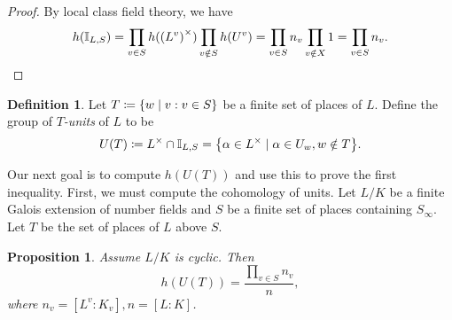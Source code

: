 \documentclass[leqno, openany]{memoir}
\newtheorem{prop}[thm]{Proposition}
\theoremstyle{definition}
\newtheorem{defn}[thm]{Definition}
\theoremstyle{remark}
\theoremstyle{plain}
\theoremstyle{definition}
\theoremstyle{remark}
\newcommand{\I}{\mathbb{I}}
\begin{document}
\begin{proof}
    By local class field theory, we have
    \[ h(\I_{L, S}) = \prod_{v \in S} h({(L^v)}^{\times}) \prod_{v \notin S} h(U^v) = \prod_{v \in S} n_v \prod_{v \notin X} 1 = \prod_{v \in S} n_v. \qedhere \]
\end{proof}

\begin{defn}
    Let $T \coloneqq \qty{w \mid v : v \in S}$ be a finite set of places of $L$. Define the group of \textit{$T$-units} of $L$ to be
    \[ U(T) \coloneqq L^{\times} \cap \I_{L, S} = \qty{\alpha \in L^{\times} \mid \alpha \in U_w, w \notin T}. \]
\end{defn}

Our next goal is to compute $h(U(T))$ and use this to prove the first inequality. First, we must compute the cohomology of units. Let $L/K$ be a finite Galois extension of number fields and $S$ be a finite set of places containing $S_{\infty}$. Let $T$ be the set of places of $L$ above $S$.

\begin{prop}
    Assume $L/K$ is cyclic. Then 
    \[ h(U(T)) = \frac{\prod_{v \in S} n_v}{n}, \] 
    where $n_v = [L^v:K_v], n=[L:K]$.
\end{prop}
\end{document}

